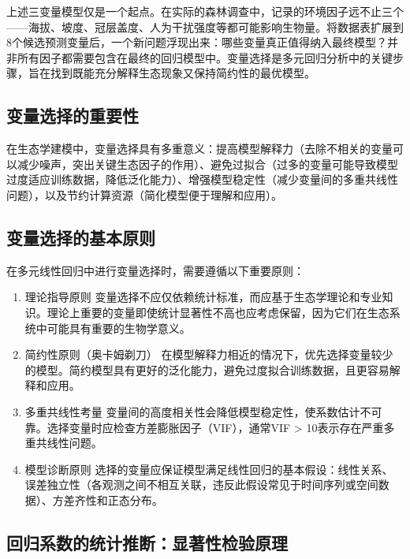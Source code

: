 \documentclass[
  twoside,12pt,fontset=none]{ctexbook}
\begin{document}
上述三变量模型仅是一个起点。在实际的森林调查中，记录的环境因子远不止三个------海拔、坡度、冠层盖度、人为干扰强度等都可能影响生物量。将数据表扩展到8个候选预测变量后，一个新问题浮现出来：哪些变量真正值得纳入最终模型？并非所有因子都需要包含在最终的回归模型中。变量选择是多元回归分析中的关键步骤，旨在找到既能充分解释生态现象又保持简约性的最优模型。

\hypertarget{ux53d8ux91cfux9009ux62e9ux7684ux91cdux8981ux6027}{%
\subsection{变量选择的重要性}\label{ux53d8ux91cfux9009ux62e9ux7684ux91cdux8981ux6027}}

在生态学建模中，变量选择具有多重意义：提高模型解释力（去除不相关的变量可以减少噪声，突出关键生态因子的作用）、避免过拟合（过多的变量可能导致模型过度适应训练数据，降低泛化能力）、增强模型稳定性（减少变量间的多重共线性问题），以及节约计算资源（简化模型便于理解和应用）。

\hypertarget{ux53d8ux91cfux9009ux62e9ux7684ux57faux672cux539fux5219}{%
\subsection{变量选择的基本原则}\label{ux53d8ux91cfux9009ux62e9ux7684ux57faux672cux539fux5219}}

在多元线性回归中进行变量选择时，需要遵循以下重要原则：

\begin{enumerate}
\def\labelenumi{\arabic{enumi}.}
\item
  理论指导原则
  变量选择不应仅依赖统计标准，而应基于生态学理论和专业知识。理论上重要的变量即使统计显著性不高也应考虑保留，因为它们在生态系统中可能具有重要的生物学意义。
\item
  简约性原则（奥卡姆剃刀）
  在模型解释力相近的情况下，优先选择变量较少的模型。简约模型具有更好的泛化能力，避免过度拟合训练数据，且更容易解释和应用。
\item
  多重共线性考量
  变量间的高度相关性会降低模型稳定性，使系数估计不可靠。选择变量时应检查方差膨胀因子（VIF），通常VIF \textgreater{} 10表示存在严重多重共线性问题。
\item
  模型诊断原则
  选择的变量应保证模型满足线性回归的基本假设：线性关系、误差独立性（各观测之间不相互关联，违反此假设常见于时间序列或空间数据）、方差齐性和正态分布。
\end{enumerate}

\hypertarget{ux56deux5f52ux7cfbux6570ux7684ux7edfux8ba1ux63a8ux65adux663eux8457ux6027ux68c0ux9a8cux539fux7406}{%
\subsection{回归系数的统计推断：显著性检验原理}\label{ux56deux5f52ux7cfbux6570ux7684ux7edfux8ba1ux63a8ux65adux663eux8457ux6027ux68c0ux9a8cux539fux7406}}
\end{document}
